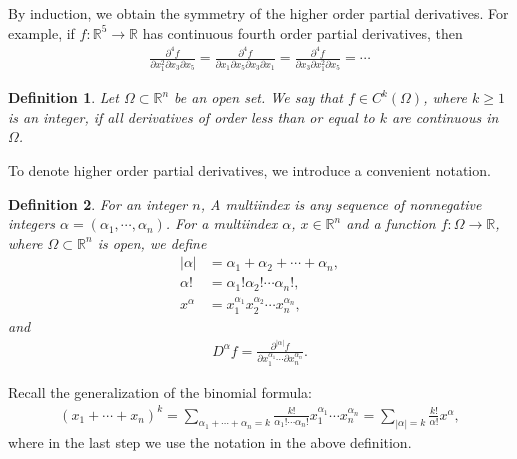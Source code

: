 \documentclass[10pt]{book}
\newtheorem{definition}{Definition}[chapter]
\theoremstyle{definition}
\numberwithin{equation}{chapter}
\begin{document}
By induction, we obtain the symmetry of the higher order partial derivatives. For example, if $f: \mathbb{R}^5 \to \mathbb{R}$ has continuous fourth order partial derivatives, then
\begin{align*}
    \frac{\partial^4 f}{\partial x_1^2 \partial x_3 \partial x_5} = \frac{\partial^4 f}{\partial x_1 \partial x_5 \partial x_3 \partial x_1} = \frac{\partial^4 f}{\partial x_3 \partial x_1^2 \partial x_5} = \cdots
\end{align*}

\medskip

\begin{definition}
Let $\Omega \subset \mathbb{R}^n$ be an open set. We say that $f \in C^k(\Omega)$, where $k \geq 1$ is an integer, if all derivatives of order less than or equal to $k$ are continuous in $\Omega$.
\end{definition}

\medskip

To denote higher order partial derivatives, we introduce a convenient notation.

\medskip

\begin{definition}
For an integer $n$, A multiindex is any sequence of nonnegative integers $\alpha = (\alpha_1,\cdots,\alpha_n)$. For a multiindex $\alpha$, $x \in \mathbb{R}^n$ and a function $f: \Omega \to \mathbb{R}$, where $\Omega \subset \mathbb{R}^n$ is open, we define
\begin{align*}
    \left|\alpha\right| & = \alpha_1 + \alpha_2 + \cdots + \alpha_n, \\ \alpha! & = \alpha_1! \alpha_2! \cdots \alpha_n!, \\
    x^{\alpha} & = x_1^{\alpha_1} x_2^{\alpha_2} \cdots x_n^{\alpha_n},
\end{align*}
and
\begin{align*}
    D^{\alpha} f = \frac{\partial^{\left|\alpha\right|}f}{\partial x_1^{\alpha_1} \cdots \partial x_n^{\alpha_n}}.
\end{align*}
\end{definition}

\medskip

Recall the generalization of the binomial formula:
\begin{align*}
    (x_1 + \cdots + x_n)^k = \sum_{\alpha_1 + \cdots + \alpha_n = k} \frac{k!}{\alpha_1! \cdots \alpha_n!} x_1^{\alpha_1} \cdots x_n^{\alpha_n} = \sum_{\left|\alpha\right|=k} \frac{k!}{\alpha!} x^{\alpha},
\end{align*}
where in the last step we use the notation in the above definition.
\end{document}
